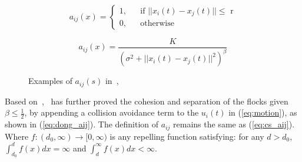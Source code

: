 \begin{equation}\label{eq:vicsek_aij}
a_{ij}(x)=\left\{\begin{array}{rcl}
1, & & \text{if $||x_i(t)-x_j(t)||\leq$ r}\\
0, & & \text{otherwise}
\end{array} \right.
\end{equation}

\begin{equation}\label{eq:cs_aij}
a_{ij}(x)=\frac{K}{(\sigma^2+||x_i(t)-x_j(t)||^2)^{\beta}}
\end{equation}

\begin{figure}[htb]
  \centering
  \caption{Examples of $a_{ij}(s)$ in~\cite{Vicsek1995},~\cite{CuckerSmale2007}}\label{fig:example_v}
\end{figure}

Based on~\cite{CuckerSmale2007},~\cite{CuckerDong2010} has further proved the cohesion and separation of the flocks given $\beta\leq\frac{1}{2}$, by appending a collision avoidance term to the $u_i(t)$ in (\ref{eq:motion}), as shown in (\ref{eq:dong_aij}). The definition of $a_{ij}$ remains the same as (\ref{eq:cs_aij}). Where $f:(d_0,\infty)\to[0,\infty)$ is any repelling function satisfying: for any $d>d_0$, $\int_{d_0}^d f(x)dx=\infty$ and $\int_d^{\infty} f(x)dx<\infty$.

